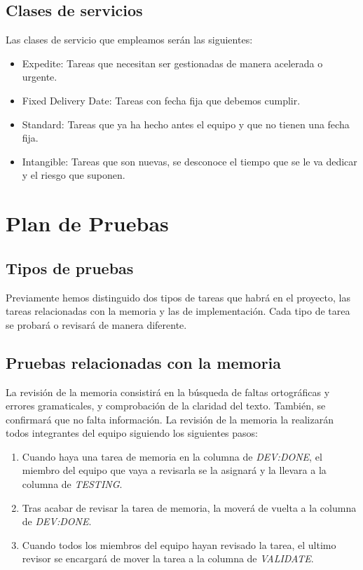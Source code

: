 \subsection{Clases de servicios}
Las clases de servicio que empleamos serán las siguientes:
\begin{itemize}
    \item Expedite: Tareas que necesitan ser gestionadas de manera acelerada o urgente.  
    \item Fixed Delivery Date: Tareas con fecha fija que debemos cumplir.
    \item Standard: Tareas que ya ha hecho antes el equipo y que no tienen una fecha fija.
    \item Intangible: Tareas que son nuevas, se desconoce el tiempo que se le va dedicar y el riesgo que suponen.
\end{itemize}



\section{Plan de Pruebas}
\nocite{pipelineRedHat}
\nocite{testingSW}
\nocite{ciAmazon}
\subsection{Tipos de pruebas}
Previamente hemos distinguido dos tipos de tareas que habrá en el proyecto, las tareas relacionadas con la memoria y las de implementación. Cada tipo de tarea se probará o revisará de manera diferente.
\subsection{Pruebas relacionadas con la memoria}
La revisión de la memoria consistirá en la búsqueda de faltas ortográficas y errores gramaticales, y comprobación de la claridad del texto. También, se confirmará que no falta información.
La revisión de la memoria la realizarán todos integrantes del equipo siguiendo los siguientes pasos:
\begin{enumerate}
    \item Cuando haya una tarea de memoria en la columna de \textit{DEV:DONE}, el miembro del equipo que vaya a revisarla se la asignará y la llevara a la columna de \textit{TESTING}.
    \item Tras acabar de revisar la tarea de memoria, la moverá de vuelta a la columna de \textit{DEV:DONE}.
    \item Cuando todos los miembros del equipo hayan revisado la tarea, el ultimo revisor se encargará de mover la tarea a la columna de \textit{VALIDATE}.
\end{enumerate}
